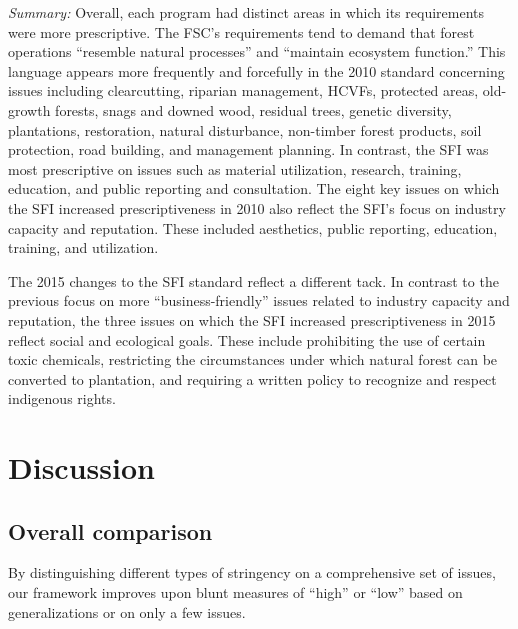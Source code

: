 \documentclass[
      12pt,
            Review ]{article}
\begin{document}
\emph{Summary:} Overall, each program had distinct areas in which its
requirements were more prescriptive. The FSC's requirements tend to
demand that forest operations ``resemble natural processes'' and
``maintain ecosystem function.'' This language appears more frequently
and forcefully in the 2010 standard concerning issues including
clearcutting, riparian management, HCVFs, protected areas, old-growth
forests, snags and downed wood, residual trees, genetic diversity,
plantations, restoration, natural disturbance, non-timber forest
products, soil protection, road building, and management planning. In
contrast, the SFI was most prescriptive on issues such as material
utilization, research, training, education, and public reporting and
consultation. The eight key issues on which the SFI increased
prescriptiveness in 2010 also reflect the SFI's focus on industry
capacity and reputation. These included aesthetics, public reporting,
education, training, and utilization.

The 2015 changes to the SFI standard reflect a different tack. In
contrast to the previous focus on more ``business-friendly'' issues
related to industry capacity and reputation, the three issues on which
the SFI increased prescriptiveness in 2015 reflect social and ecological
goals. These include prohibiting the use of certain toxic chemicals,
restricting the circumstances under which natural forest can be
converted to plantation, and requiring a written policy to recognize and
respect indigenous rights.

\section{Discussion}\label{discussion}

\subsection{Overall comparison}\label{overall-comparison}

By distinguishing different types of stringency on a comprehensive set
of issues, our framework improves upon blunt measures of ``high'' or
``low'' based on generalizations or on only a few issues.
\end{document}

